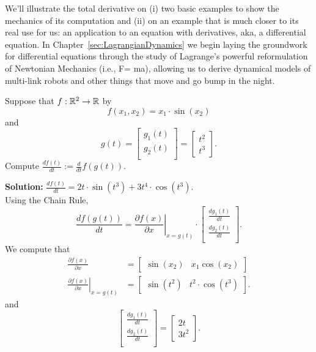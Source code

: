 \bigskip




\bigskip
We'll illustrate the total derivative on (i) two basic examples to show the mechanics of its computation and (ii) on an example that is much closer to its real use for us: an application to an equation with derivatives, aka, a differential equation. In Chapter~\ref{sec:LagrangianDynamics} we begin laying the groundwork for differential equations through the study of Lagrange's powerful reformulation of Newtonian Mechanics (i.e., F= ma), allowing us to derive dynamical models of multi-link robots and other things that move and go bump in the night.

\bigskip

\begin{example} 
 Suppose that $f:\mathbb R^2 \to \mathbb R$ by
$$f(x_1, x_2) = x_1 \cdot \sin(x_2) $$
and 
$$g(t) =\left[
\begin{array}{c}
g_1(t) \\
g_2(t) \\
\end{array}
\right] = \left[
\begin{array}{c}
t^2\\
t^3
\end{array}
\right]. $$
Compute $\frac{df(t)}{dt} := \frac{d}{dt} f(g(t))$.
\end{example}

\textbf{Solution:} $\frac{df(t)}{dt} = 
2 t \cdot \sin\left( t^{3} \right) + 3 t^{4} \cdot \cos\left( t^{3} \right)$.\\

Using the Chain Rule,
\[
\frac{df(g(t))}{dt} = \left. \frac{\partial f(x)}{\partial x}\right|_{x = g(t)} \cdot  \left[
\begin{array}{c}
\frac{d g_1(t)}{dt} \\
\frac{d g_2(t)}{dt}  \\
\end{array}
\right].
\]
We compute that
\begin{align*}
    \frac{\partial f(x)}{\partial x} &= \left[
\begin{array}{cc}
\sin(x_2) &
x_1 \cos(x_2) 
\end{array}
\right] \\[1em]
\left. \frac{\partial f(x)}{\partial x}\right|_{x = g(t)} &= \left[ \begin{array}{cc}
\sin(t^2) &
t^2 \cdot \cos(t^3) 
\end{array}
\right].
\end{align*}
and
$$
\left[
\begin{array}{c}
\frac{d g_1(t)}{dt} \\
\frac{d g_2(t)}{dt}  \\
\end{array}
\right] = \left[
\begin{array}{c}
2 t\\
3 t^2
\end{array}
\right].
$$

